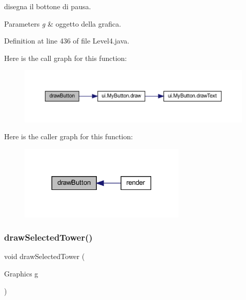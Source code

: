 disegna il bottone di pausa. 


\begin{DoxyParams}{Parameters}
{\em g} & oggetto della grafica. \\
\hline
\end{DoxyParams}


Definition at line 436 of file Level4.\+java.

Here is the call graph for this function\+:\nopagebreak
\begin{figure}[H]
\begin{center}
\leavevmode
\includegraphics[width=350pt]{classscenes_1_1_level4_a65768678909bc0512c6cb9780709ad38_cgraph}
\end{center}
\end{figure}
Here is the caller graph for this function\+:\nopagebreak
\begin{figure}[H]
\begin{center}
\leavevmode
\includegraphics[width=225pt]{classscenes_1_1_level4_a65768678909bc0512c6cb9780709ad38_icgraph}
\end{center}
\end{figure}
\mbox{\label{classscenes_1_1_level4_a0a97d0bb6d32640b2ae351707946abf7}} 
\subsubsection{\texorpdfstring{draw\+Selected\+Tower()}{drawSelectedTower()}}
{\footnotesize\ttfamily void draw\+Selected\+Tower (\begin{DoxyParamCaption}\item[{Graphics}]{g }\end{DoxyParamCaption})\hspace{0.3cm}{\ttfamily [private]}}




